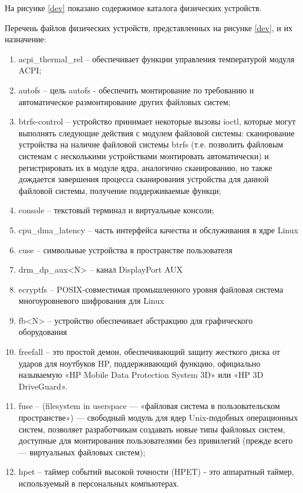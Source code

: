 \newpage
На рисунке \ref{dev} показано содержимое каталога физических устройств.

Перечень файлов физических устройств, представленных на рисунке \ref{dev}, и их назначение:
\begin{enumerate}
    \item acpi\_thermal\_rel -- обеспечивает функции управления температурой модуля ACPI;
    \item autofs -- цель autofs - обеспечить монтирование по требованию и автоматическое размонтирование других файловых систем;
    \item btrfs-control -- устройство принимает некоторые вызовы ioctl, которые могут выполнять следующие действия с модулем файловой системы: сканирование устройства на наличие файловой системы btrfs (т.е. позволить файловым системам с несколькими устройствами монтировать автоматически) и регистрировать их в модуле ядра,   аналогично сканированию, но также дождается завершения процесса сканирования устройства для данной файловой системы, получение поддерживаемые функци;
    \item console -- текстовый терминал и виртуальные консоли;
    \item cpu\_dma\_latency -- часть интерфейса качества и обслуживания в ядре Linux
    \item cuse -- символьные устройства в пространстве пользователя
    \item drm\_dp\_aux<N> -- канал DisplayPort AUX
    \item ecryptfs -- POSIX-совместимая промышленного уровня файловая система многоуровневого шифрования для Linux
    \item fb<N> -- устройство обеспечивает абстракцию для графического оборудования
    \item freefall -- это простой демон, обеспечивающий защиту жесткого диска от ударов для ноутбуков HP, поддерживающий функцию, официально называемую «HP Mobile Data Protection System 3D» или «HP 3D DriveGuard».
    \item fuse -- (filesystem in userspace — «файловая система в пользовательском пространстве») — свободный модуль для ядер Unix-подобных операционных систем, позволяет разработчикам создавать новые типы файловых систем, доступные для монтирования пользователями без привилегий (прежде всего — виртуальных файловых систем);
    \item hpet -- таймер событий высокой точности (HPET) - это аппаратный таймер, используемый в персональных компьютерах.

\end{enumerate}
